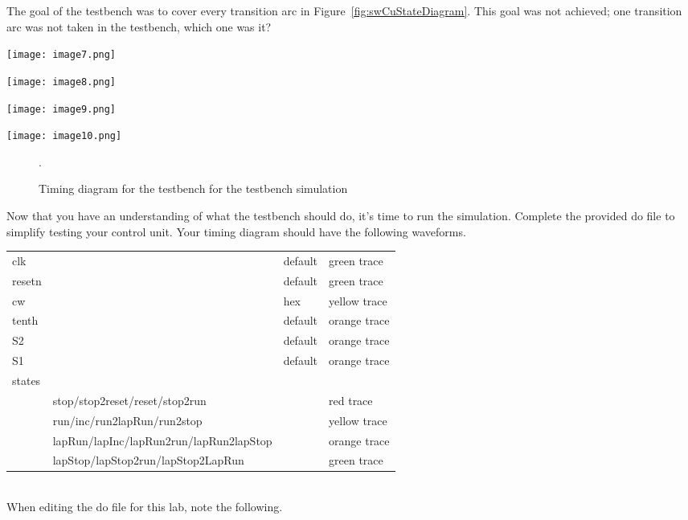 The goal of the testbench was to cover every transition arc in Figure~\ref{fig:swCuStateDiagram}.
This goal was not achieved; one transition arc was not taken in the
testbench, which one was it?

\begin{landscape}

\texttt{[image: image7.png]}

\texttt{[image: image8.png]}


\texttt{[image: image9.png]}

\texttt{[image: image10.png]}
\begin{figure}
\caption{Timing diagram for the testbench for the testbench simulation}.
\label{fig:swCuSimTiming}
\end{figure}
\end{landscape}

Now that you have an understanding of what the testbench should do, it's
time to run the simulation. Complete the provided do file to simplify
testing your control unit. Your timing diagram should have the following
\hypertarget{swCuWaveform}{%
waveforms.
\label{swCuWaveform}}

\begin{tabular}{p{0.5cm}p{1.5cm}p{5cm}p{3cm}}
  clk 		& & default 		& green trace	\\ 
  resetn 	& & default 		& green trace	\\
  cw 		& & hex 		& yellow trace	\\
  tenth 	& & default 		& orange trace	\\
  S2 		& & default 		& orange trace	\\
  S1 		& & default 		& orange trace	\\
  states 	& &   		&			\\
 & stop/stop2reset/reset/stop2run 			& & red trace	\\ 
& run/inc/run2lapRun/run2stop 			& & yellow 	trace\\ 
& lapRun/lapInc/lapRun2run/lapRun2lapStop	& & orange  trace\\
& lapStop/lapStop2run/lapStop2LapRun   		&  & green  trace\\
\end{tabular}\\

When editing the do file for this lab, note the following.


